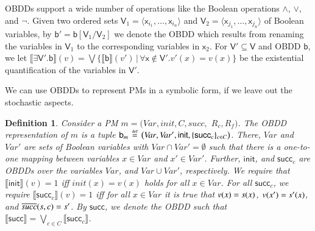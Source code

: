 \documentclass[10pt,twocolumn]{article}
\newtheorem{definition}{Definition}
\newcommand{\state}  {{\ensuremath s}}
\newcommand{\bdd}{\mathsf{b}}
\newcommand{\bddVars}{\mathsf{V}}
\newcommand{\bddVar}{\mathsf{x}}
\newcommand{\bddInit}{\mathsf{init}}
\newcommand{\bddSucc}{\mathsf{succ}}
\newcommand{\prismModel}{m}
\newcommand{\prismVar}{x}
\newcommand{\prismVars}{\mathit{Var}}
\newcommand{\prismInit}{\mathit{init}}
\newcommand{\prismSucc}{\mathit{succ}}
\newcommand{\prismNSucc}{\overline{\prismSucc}}
\newcommand{\prismCmds}{C}
\newcommand{\prismCmd}{c}
\newcommand{\prismCRew}{R_c}
\newcommand{\prismFRew}{R_f}
\newcommand{\defeq}{\,\stackrel{\mbox{\rm {\tiny def}}}{=}\,}
\newcommand{\sem}[1]{\ensuremath{\llbracket #1 \rrbracket}\xspace}
\begin{document}
OBDDs support a wide number of operations like the Boolean operations $\wedge$,
$\vee$, and $\neg$. Given two ordered sets $\bddVars_1 = \langle \bddVar_{i_1}, \ldots, \bddVar_{i_n} \rangle$ and
$\bddVars_2 = \langle \bddVar_{j_1}, \ldots, \bddVar_{j_n} \rangle$ of
Boolean variables, by $\bdd' = \bdd[\bddVars_1 / \bddVars_2]$ we denote the OBDD
which results from renaming the variables in $\bddVars_1$ to the corresponding
variables in $\bddVar_2$.
For $\bddVars' \subseteq \bddVars$ and OBDD $\bdd$, we let 
$\sem{\exists\bddVars'.\bdd}(v) = \bigvee \bigl\{ \sem{\bdd}(v') \,\big|\, \forall \bddVar
\notin \bddVars' . v'(x) = v(x) \bigr\}$ be the existential quantification of the
variables in $\bddVars'$.

We can use OBDDs to represent PMs in a symbolic form, if we leave out the stochastic aspects.
\begin{definition}
  \label{def:bdd-repr}
  Consider a PM $\prismModel = (\prismVars, \prismInit, \prismCmds, \prismSucc,$ $\prismCRew, \prismFRew)$.
  The \emph{OBDD representation} of $\prismModel$ is a tuple $\bdd_\prismModel \defeq \bigl(\prismVars, \prismVars', \bddInit, \{ \bddSucc_\prismCmd \}_{\prismCmd \in \prismCmds}\bigr)$.
  There, $\prismVars$ and $\prismVars'$ are sets of Boolean variables with $\prismVars \cap \prismVars' = \emptyset$ such that there is a one-to-one mapping between variables $\prismVar \in \prismVars$ and $\prismVar' \in \prismVars'$.
  Further, $\bddInit$, and $\bddSucc_\prismCmd$ are OBDDs over the variables $\prismVars$, and $\prismVars \cup \prismVars'$, respectively.
  We require that $\sem{\bddInit}(v) = 1$ iff $\prismInit(\prismVar) = v(\prismVar)$ holds for all $\prismVar \in \prismVars$.
  For all $\bddSucc_\prismCmd$, we require $\sem{\bddSucc_\prismCmd}(v) = 1$ iff for all $\prismVar \in \prismVars$ it is true
  that $v(\prismVar) = \state(\prismVar)$, $v(\prismVar') = \state'(\prismVar)$, and $\prismNSucc(\state, \prismCmd) = \state'$.
  By $\bddSucc$, we denote the OBDD such that $\sem{\bddSucc} = \bigvee_{\prismCmd \in \prismCmds} \sem{\bddSucc_\prismCmd}$.
\end{definition}
\end{document}
